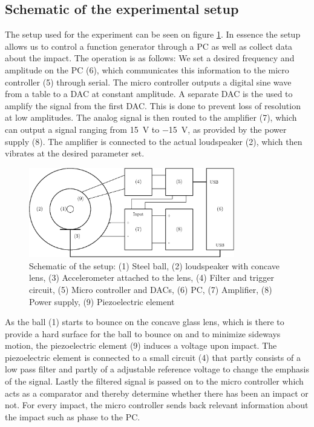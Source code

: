 \documentclass[12pt,oneside,a4paper]{article}
\numberwithin{equation}{section}
\begin{document}
{{{{\subsection{Schematic of the experimental setup}
The setup used for the experiment can be seen on figure \ref{setupdia}. In essence the setup allows us to control a function generator through a PC as well as collect data about the impact. The operation is as follows: We set a desired frequency and amplitude on the PC (6), which communicates this information to the micro controller (5) through serial. The micro controller outputs a digital sine wave from a table to a DAC at constant amplitude. A separate DAC is the used to amplify the signal from the first DAC. This is done to prevent loss of resolution at low amplitudes. The analog signal is then routed to the amplifier (7), which can output a signal ranging from \SI{+15}{V} to \SI{-15}{V}, as provided by the power supply (8). The amplifier is connected to the actual loudspeaker (2), which then vibrates at the desired parameter set.
\begin{figure}[h]
	\centering
	\includegraphics[width=0.8\textwidth]{setup}
	\caption{Schematic of the setup: (1) Steel ball, (2) loudspeaker with concave lens, (3) Accelerometer attached to the lens, (4) Filter and trigger circuit, (5) Micro controller and DACs, (6) PC, (7) Amplifier, (8) Power supply, (9) Piezoelectric element}
	\label{setupdia}
\end{figure}
As the ball (1) starts to bounce on the concave glass lens, which is there to provide a hard surface for the ball to bounce on and to minimize sideways motion, the piezoelectric element (9) induces a voltage upon impact. The piezoelectric element is connected to a small circuit (4) that partly consists of a low pass filter and partly of a adjustable reference voltage to change the emphasis of the signal. Lastly the filtered signal is passed on to the micro controller which acts as a comparator and thereby determine whether there has been an impact or not. For every impact, the micro controller sends back relevant information about the impact such as phase to the PC.

}}}}
\end{document}
